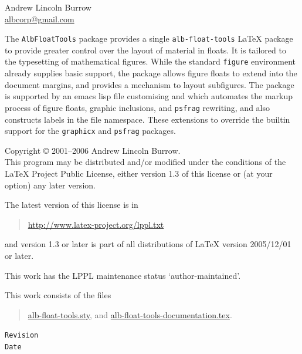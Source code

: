 \documentclass[11pt,a4paper,oneside,titlepage]{alb-corp}
\begin{document}


\begin{albTitlePage}


  Andrew Lincoln Burrow\\
  \url{albcorp@gmail.com}



  The \texttt{AlbFloatTools} package provides a single
  \texttt{alb-float-tools} \LaTeX{} package to provide greater control
  over the layout of material in floats.  It is tailored to the
  typesetting of mathematical figures.  While the standard
  \texttt{figure} environment already supplies basic support, the
  package allows figure floats to extend into the document margins, and
  provides a mechanism to layout subfigures.  The package is supported
  by an emacs lisp file customising \AUCTeX{} and \RefTeX{} which
  automates the markup process of figure floats, graphic inclusions, and
  \texttt{psfrag} rewriting, and also constructs labels in the file
  namespace.  These extensions to \AUCTeX{} override the builtin support
  for the \texttt{graphicx} and \texttt{psfrag} packages.



  Copyright \copyright{} 2001--2006 Andrew Lincoln Burrow.\\
  This program may be distributed and/or modified under the conditions
  of the \LaTeX{} Project Public License, either version 1.3 of this
  license or (at your option) any later version.

  \medskip{}

  The latest version of this license is in
  \begin{quote}
    \url{http://www.latex-project.org/lppl.txt}
  \end{quote}
  and version 1.3 or later is part of all distributions of LaTeX version
  2005/12/01 or later.

  \medskip{}

  This work has the LPPL maintenance status `author-maintained'.

  \medskip{}

  This work consists of the files
  \begin{quote}
    \begin{flushleft}
      \url{alb-float-tools.sty}, and
      \url{alb-float-tools-documentation.tex}.
    \end{flushleft}
  \end{quote}



  \verb$Revision$\\
  \verb$Date$

\end{albTitlePage}
\end{document}
